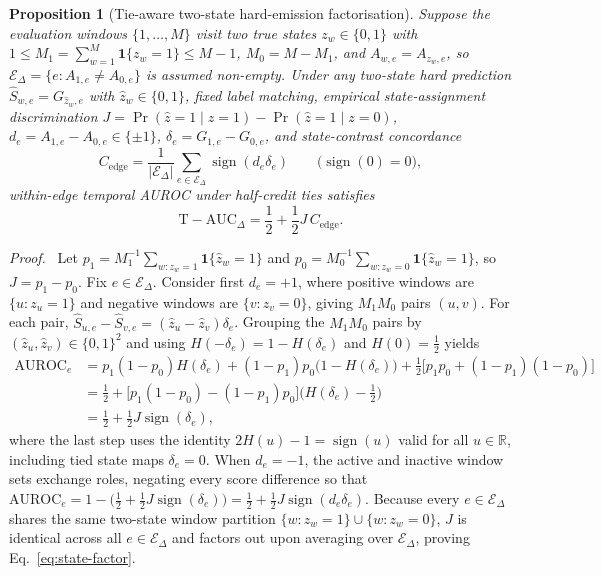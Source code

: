 \documentclass[11pt]{article}
\newtheorem{proposition}{Proposition}
\newenvironment{proof}[1][Proof]{\par\noindent\textit{#1.}\ }{\nobreak\hspace*{\fill}\begingroup\setlength{\fboxsep}{0pt}\fbox{\rule{0pt}{0.52em}\hspace{0.52em}}\endgroup\par\smallskip}
\begin{document}
\begin{proposition}[Tie-aware two-state hard-emission factorisation]
\label{prop:supp-state-factor}
Suppose the evaluation windows $\{1,\dots,M\}$ visit two true states
$z_w\in\{0,1\}$ with $1\le M_1=\sum_{w=1}^M \mathbf1\{z_w=1\}\le M-1$, $M_0=M-M_1$,
and $A_{w,e}=A_{z_w,e}$, so $\mathcal E_\Delta=\{e:A_{1,e}\neq A_{0,e}\}$ is
assumed non-empty. Under any two-state hard prediction
$\widehat S_{w,e}=G_{\widehat z_w,e}$ with $\widehat z_w\in\{0,1\}$, fixed label
matching, empirical state-assignment discrimination
$J=\Pr(\widehat z=1\mid z=1)-\Pr(\widehat z=1\mid z=0)$, $d_e=A_{1,e}-A_{0,e}\in\{\pm1\}$,
$\delta_e=G_{1,e}-G_{0,e}$, and state-contrast concordance
\begin{equation*}
C_{\mathrm{edge}}=\frac1{|\mathcal E_\Delta|}\sum_{e\in\mathcal E_\Delta}
\operatorname{sign}(d_e\delta_e)
\qquad\bigl(\operatorname{sign}(0)=0\bigr),
\end{equation*}
within-edge temporal AUROC under half-credit ties satisfies
\begin{equation}
\mathrm{T\!-\!AUC}_{\Delta}=\frac12+\frac12 J\,C_{\mathrm{edge}}.
\label{eq:state-factor}
\end{equation}
\end{proposition}

\begin{proof}
Let $p_1=M_1^{-1}\sum_{w:z_w=1}\mathbf1\{\widehat z_w=1\}$ and
$p_0=M_0^{-1}\sum_{w:z_w=0}\mathbf1\{\widehat z_w=1\}$, so $J=p_1-p_0$.
Fix $e\in\mathcal E_\Delta$. Consider first $d_e=+1$, where positive windows are
$\{u:z_u=1\}$ and negative windows are $\{v:z_v=0\}$, giving $M_1 M_0$ pairs
$(u,v)$. For each pair, $\widehat S_{u,e}-\widehat S_{v,e}=(\widehat z_u-\widehat z_v)\delta_e$.
Grouping the $M_1 M_0$ pairs by $(\widehat z_u,\widehat z_v)\in\{0,1\}^2$ and using
$H(-\delta_e)=1-H(\delta_e)$ and $H(0)=\tfrac12$ yields
\begin{align*}
\mathrm{AUROC}_e
&=p_1(1-p_0)H(\delta_e)+(1-p_1)p_0\bigl(1-H(\delta_e)\bigr)
+\tfrac12\bigl[p_1 p_0+(1-p_1)(1-p_0)\bigr]\\
&=\tfrac12+\bigl[p_1(1-p_0)-(1-p_1)p_0\bigr]\bigl(H(\delta_e)-\tfrac12\bigr)\\
&=\tfrac12+\tfrac12 J\operatorname{sign}(\delta_e),
\end{align*}
where the last step uses the identity $2H(u)-1=\operatorname{sign}(u)$ valid for
all $u\in\mathbb R$, including tied state maps $\delta_e=0$. When $d_e=-1$, the
active and inactive window sets exchange roles, negating every score difference
so that $\mathrm{AUROC}_e=1-\bigl(\tfrac12+\tfrac12 J\operatorname{sign}(\delta_e)\bigr)
=\tfrac12+\tfrac12 J\operatorname{sign}(d_e\delta_e)$. Because every
$e\in\mathcal E_\Delta$ shares the same two-state window partition
$\{w:z_w=1\}\cup\{w:z_w=0\}$, $J$ is identical across all $e\in\mathcal E_\Delta$
and factors out upon averaging over $\mathcal E_\Delta$, proving Eq.~\eqref{eq:state-factor}.
\end{proof}
\end{document}
